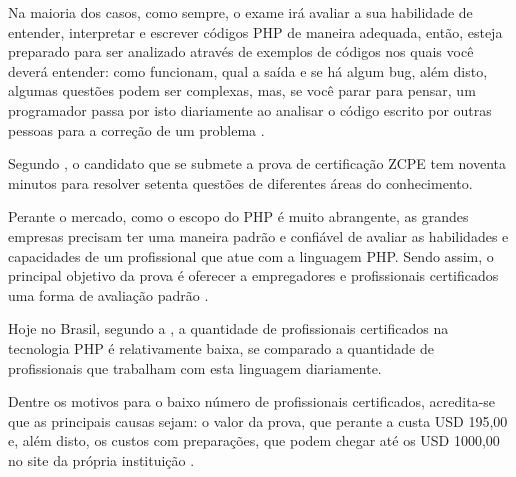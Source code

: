 Na maioria dos casos, como sempre, o exame irá avaliar a sua habilidade de
entender, interpretar e escrever códigos \acs{PHP} de maneira adequada, então,
esteja preparado para ser analizado através de exemplos de códigos nos quais
você deverá entender: como funcionam, qual a saída e se há algum \acs{bug},
além disto, algumas questões podem ser complexas, mas, se você parar para
pensar, um programador passa por isto diariamente ao analisar o código escrito
por outras pessoas para a correção de um problema
\cite{theZendPHPCertificationPracticeTestBook}.

Segundo , o candidato que se
submete a prova de certificação \acs{ZCPE} tem noventa minutos para resolver 
setenta questões de diferentes áreas do conhecimento.

Perante o mercado, como o escopo do PHP é muito abrangente, as grandes empresas
precisam ter uma maneira padrão e confiável de avaliar as habilidades e 
capacidades de um profissional que atue com a linguagem PHP. Sendo assim, o
principal objetivo da prova é oferecer a empregadores e profissionais 
certificados uma forma de avaliação padrão \cite{zendPhp5CertificationStudyGuide}.

Hoje no Brasil, segundo a , a 
quantidade de profissionais certificados na tecnologia PHP é relativamente 
baixa, se comparado a quantidade de profissionais que trabalham com esta 
linguagem diariamente.

Dentre os motivos para o baixo número de profissionais certificados, acredita-se
que as principais causas sejam: o valor da prova, que perante a 
 custa USD 195,00 e, além disto,  os
custos com preparações, que podem chegar até os USD 1000,00 no site da  própria
instituição \cite{websiteZendOnlineTraining}.

